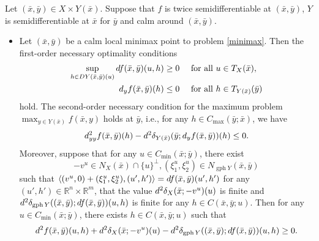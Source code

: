 \documentclass[10pt,a4paper]{amsart}
\begin{document}
\begin{theorem}\label{main1}
Let $(\bar x, \bar y)\in X \times Y(\bar x)$. Suppose that $f$ is twice semidifferentiable at $(\bar x, \bar y)$, $Y$ is semidifferentiable at $\bar x$ for $\bar y$ and calm around $(\bar x,\bar y)$. 


\begin{itemize}
\item[(a)] Let $(\bar x,\bar y)$ be a calm local minimax point to problem \eqref{minimax}. 
 Then the first-order necessary optimality conditions 
 \begin{align}
  \sup\limits_{h \in D Y(\bar x,\bar y)(u)} {\rm d} f(\bar x,\bar y)(u,h) \geq 0 \quad &\text { for all } u\in T_{X}(\bar x), \label{firstordercond11}\\
{\rm d}_y f(\bar x,\bar y)(h)\leq 0 \quad  &\text { for all } h \in T_{ Y(\bar x)}(\bar y)\label{firstordercond21}
   \end{align}
hold. 
The second-order necessary condition for the maximum problem $\max_{y\in Y(\bar x)} f(\bar x, y)$ holds at $\bar y$, i.e., for any $h\in C_{\max}(\bar y;\bar x)$, we have
\begin{equation*}\label{necelower1}
{\rm d}^2_{yy} f(\bar x,\bar y)(h) -{\rm d}^2 \delta_{Y(\bar x)}(\bar y;{\rm d}_yf(\bar x,\bar y))(h) \leq 0.
\end{equation*}
 Moreover, suppose that for any $u\in C_{\min}(\bar x; \bar y)$, there exist $$-v^u\in N_X(\bar x)\cap \{u\}^\perp, (\xi_1^u,\xi_2^u) \in N_{\operatorname{gph}Y}(\bar x,\bar y)$$ such that  $\langle (v^u,0)+(\xi_1^u,\xi_2^u), (u',h') \rangle = {\rm d} f(\bar x,\bar y)(u',h')$ for any $(u',h') \in \mathbb{R}^n \times \mathbb{R}^m$, that the value ${\rm d}^2 \delta_X(\bar x;-v^u)(u)$ is finite and ${\rm d}^2 \delta_{\operatorname{gph}Y}((\bar x,\bar y);{\rm d}f(\bar x,\bar y))(u,h)$ is finite for any $h \in C(\bar x,\bar y;u)$. Then 
 for any $u\in C_{\min}(\bar x; \bar y)$, there exists
 $h\in C(\bar x,\bar y;u)$ 
  such that
 \begin{equation*}\label{eqn4.111}
{\rm d}^2 f(\bar x,\bar y)(u,h) + {\rm d}^2 \delta_X(\bar x;-v^u)(u) -{\rm d}^2 \delta_{\operatorname{gph}Y}((\bar x,\bar y);{\rm d}f(\bar x,\bar y))(u,h)  \geq 0.
\end{equation*}


\end{itemize}
\end{theorem}
\end{document}
